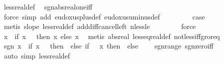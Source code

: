 \begin{isabellebody}
\ less{\isacharunderscore}{\kern0pt}real{\isacharunderscore}{\kern0pt}def\ \isamarkupfalse%
\ sgn{\isacharunderscore}{\kern0pt}abs{\isacharunderscore}{\kern0pt}real{\isacharunderscore}{\kern0pt}one{\isacharunderscore}{\kern0pt}iff\ \isamarkupfalse%
\ {\isacharparenleft}{\kern0pt}force\ simp\ add{\isacharcolon}{\kern0pt}\ eudoxus{\isacharunderscore}{\kern0pt}plus{\isacharunderscore}{\kern0pt}def\ eudoxus{\isacharunderscore}{\kern0pt}uminus{\isacharunderscore}{\kern0pt}def{\isacharparenright}{\kern0pt}\ \isanewline
\ \ \ \ \ \ \isamarkupfalse%
\ {\isacharquery}{\kern0pt}case\ \isamarkupfalse%
\ {\isacharparenleft}{\kern0pt}metis\ slope{\isacharparenleft}{\kern0pt}{}{\isacharparenright}{\kern0pt}\ less{\isacharunderscore}{\kern0pt}real{\isacharunderscore}{\kern0pt}def\ add{\isacharunderscore}{\kern0pt}diff{\isacharunderscore}{\kern0pt}cancel{\isacharunderscore}{\kern0pt}left\ nless{\isacharunderscore}{\kern0pt}le{\isacharparenright}{\kern0pt}\isanewline
\ \ \ \ \isamarkupfalse%
\isanewline
\ \ \isamarkupfalse%
\ {\isacharparenleft}{\kern0pt}force{\isacharparenright}{\kern0pt}\isanewline
\isanewline
\ \ \isamarkupfalse%
\ {\isachardoublequoteopen}{\isasymbar}x{\isasymbar}\ {\isacharequal}{\kern0pt}\ {\isacharparenleft}{\kern0pt}if\ x\ {\isacharless}{\kern0pt}\ {}\ then\ {\isacharminus}{\kern0pt}x\ else\ x{\isacharparenright}{\kern0pt}{\isachardoublequoteclose}\ \isamarkupfalse%
\ {\isacharparenleft}{\kern0pt}metis\ abs{\isacharunderscore}{\kern0pt}real\ less{\isacharunderscore}{\kern0pt}eq{\isacharunderscore}{\kern0pt}real{\isacharunderscore}{\kern0pt}def\ not{\isacharunderscore}{\kern0pt}less{\isacharunderscore}{\kern0pt}iff{\isacharunderscore}{\kern0pt}gr{\isacharunderscore}{\kern0pt}or{\isacharunderscore}{\kern0pt}eq{\isacharparenright}{\kern0pt}\isanewline
\ \ \isamarkupfalse%
\ {\isachardoublequoteopen}sgn\ x\ {\isacharequal}{\kern0pt}\ {\isacharparenleft}{\kern0pt}if\ x\ {\isacharequal}{\kern0pt}\ {}\ then\ {}\ else\ if\ {}\ {\isacharless}{\kern0pt}\ x\ then\ {}\ else\ {\isacharminus}{\kern0pt}\ {}{\isacharparenright}{\kern0pt}{\isachardoublequoteclose}\ \isamarkupfalse%
\ sgn{\isacharunderscore}{\kern0pt}range\ sgn{\isacharunderscore}{\kern0pt}zero{\isacharunderscore}{\kern0pt}iff\ \isamarkupfalse%
\ {\isacharparenleft}{\kern0pt}auto\ simp{\isacharcolon}{\kern0pt}\ less{\isacharunderscore}{\kern0pt}real{\isacharunderscore}{\kern0pt}def{\isacharparenright}{\kern0pt}\isanewline

\end{isabellebody}
